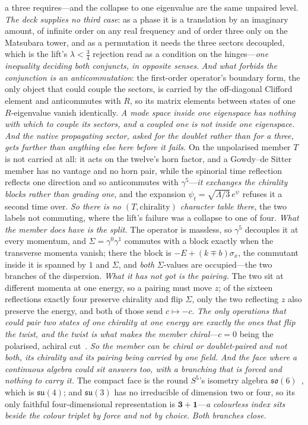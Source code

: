 \documentclass[11pt]{article}
\newcommand{\su}{\mathfrak{su}}
\newcommand{\so}{\mathfrak{so}}
\begin{document}
a three requires---and the collapse to one eigenvalue are the same unpaired level. \emph{The deck supplies no third case}: as a phase it is a translation by an imaginary amount, of infinite order on any real frequency and of order three only on the Matsubara tower, and as a permutation it needs the three sectors decoupled, which is the lift's $\lambda<\tfrac34$ rejection read as a condition on the hinges---\emph{one inequality deciding both conjuncts, in opposite senses}. \emph{And what forbids the conjunction is an anticommutation}: the first-order operator's boundary form, the only object that could couple the sectors, is carried by the off-diagonal Clifford element and anticommutes with $R$, so its matrix elements between states of one $R$-eigenvalue vanish identically. \emph{A mode space inside one eigenspace has nothing with which to couple its sectors, and a coupled one is not inside one eigenspace.} \emph{And the native propagating sector, asked for the doublet rather than for a three, gets further than anything else here before it fails.} On the unpolarised member $T$ is not carried at all: it acts on the twelve's horn factor, and a Gowdy--de Sitter member has no vantage and no horn pair, while the spinorial time reflection reflects one direction and so anticommutes with $\gamma^{5}$---\emph{it exchanges the chirality blocks rather than grading one}, and the expansion $\psi_t=\sqrt{\Lambda/3}\,e^{\psi}$ refuses it a second time over. \emph{So there is no $(T,\text{chirality})$ character table there}, the two labels not commuting, where the lift's failure was a collapse to one of four. \emph{What the member does have is the split.} The operator is massless, so $\gamma^{5}$ decouples it at every momentum, and $\Sigma=\gamma^{0}\gamma^{1}$ commutes with a block exactly when the transverse momenta vanish; there the block is $-E+(k\mp b)\sigma_x$, the commutant inside it is spanned by $1$ and $\Sigma$, and \emph{both} $\Sigma$-values are occupied---the two branches of the dispersion. \emph{What it has not got is the pairing.} The two sit at different momenta at one energy, so a pairing must move $z$; of the sixteen reflections exactly four preserve chirality and flip $\Sigma$, only the two reflecting $z$ also preserve the energy, and both of those send $c\mapsto-c$. \emph{The only operations that could pair two states of one chirality at one energy are exactly the ones that flip the twist, and the twist is what makes the member chiral}---$c=0$ being the polarised, achiral cut~\cite{JanzenDynamics}. \emph{So the member can be chiral or doublet-paired and not both, its chirality and its pairing being carried by one field.} \emph{And the face where a continuous algebra could sit answers too, with a branching that is forced and nothing to carry it.} The compact face is the round $S^{5}$'s isometry algebra $\so(6)$~\cite{JanzenBoundary}, which is $\su(4)$; and $\su(3)$ has no irreducible of dimension two or four, so its only faithful four-dimensional representation is $\mathbf 3+\mathbf 1$---\emph{a colourless index sits beside the colour triplet by force and not by choice}. \emph{Both branches close.} 
\end{document}
